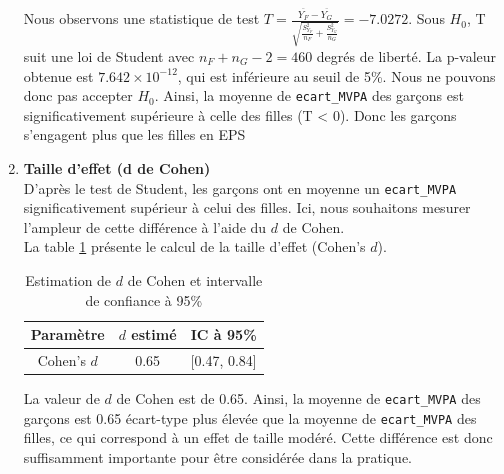\documentclass[12pt,a4paper]{article}
\begin{document}
\begin{enumerate}[label=\textbf{\alph*})]
	Nous observons une statistique de test $T = \frac{\overline{Y_F} - \overline{Y_G}}{\sqrt{\frac{S_{Y_F}^2}{n_F} + \frac{S_{Y_G}^2}{n_G}}} = -7.0272$. Sous $H_0$, T suit une loi de Student avec $n_F + n_G - 2 = 460$ degrés de liberté. La p-valeur obtenue est $7.642 \times 10^{-12}$, qui est inférieure au seuil de 5\%. Nous ne pouvons donc pas accepter $H_0$. Ainsi, la moyenne de \texttt{ecart\_MVPA} des garçons est significativement supérieure à celle des filles (T < 0). Donc les garçons s'engagent plus que les filles en EPS\\

	
	\noindent
	\item \textbf{Taille d'effet (d de Cohen)} \\
	
	D'après le test de Student, les garçons ont en moyenne un \texttt{ecart\_MVPA} significativement supérieur à celui des filles. Ici, nous souhaitons mesurer l'ampleur de cette différence à l'aide du \(d\) de Cohen. \\
	La table \ref{effect_size_1} présente le calcul de la taille d'effet (Cohen's \(d\)). 
	\begin{table}[H]
		\centering
		\caption{Estimation de \(d\) de Cohen et intervalle de confiance à 95\%}
		\begin{tabular}{ccc}
			\toprule
			Paramètre & \(d\) estimé & IC à 95\% \\
			\midrule
			Cohen's \(d\) & 0.65 & [0.47, 0.84] \\
			\bottomrule
		\end{tabular}
		\label{effect_size_1}
	\end{table}
	
	La valeur de \(d\) de Cohen est de 0.65. Ainsi, la moyenne de \texttt{ecart\_MVPA} des garçons est 0.65 écart-type plus élevée que la moyenne de \texttt{ecart\_MVPA} des filles, ce qui correspond à un effet de taille modéré. Cette différence est donc suffisamment importante pour être considérée dans la pratique.
	
\end{enumerate}
\end{document}
